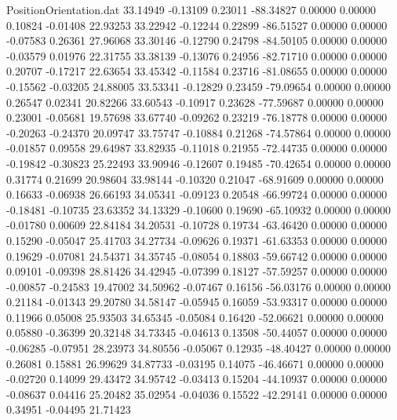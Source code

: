 \begin{filecontents}{PositionOrientation.dat}
  33.14949   -0.13109    0.23011   -88.34827    0.00000    0.00000    0.10824   -0.01408   22.93253
  33.22942   -0.12244    0.22899   -86.51527    0.00000    0.00000   -0.07583    0.26361   27.96068
  33.30146   -0.12790    0.24798   -84.50105    0.00000    0.00000   -0.03579    0.01976   22.31755
  33.38139   -0.13076    0.24956   -82.71710    0.00000    0.00000    0.20707   -0.17217   22.63654
  33.45342   -0.11584    0.23716   -81.08655    0.00000    0.00000   -0.15562   -0.03205   24.88005
  33.53341   -0.12829    0.23459   -79.09654    0.00000    0.00000    0.26547    0.02341   20.82266
  33.60543   -0.10917    0.23628   -77.59687    0.00000    0.00000    0.23001   -0.05681   19.57698
  33.67740   -0.09262    0.23219   -76.18778    0.00000    0.00000   -0.20263   -0.24370   20.09747
  33.75747   -0.10884    0.21268   -74.57864    0.00000    0.00000   -0.01857    0.09558   29.64987
  33.82935   -0.11018    0.21955   -72.44735    0.00000    0.00000   -0.19842   -0.30823   25.22493
  33.90946   -0.12607    0.19485   -70.42654    0.00000    0.00000    0.31774    0.21699   20.98604
  33.98144   -0.10320    0.21047   -68.91609    0.00000    0.00000    0.16633   -0.06938   26.66193
  34.05341   -0.09123    0.20548   -66.99724    0.00000    0.00000   -0.18481   -0.10735   23.63352
  34.13329   -0.10600    0.19690   -65.10932    0.00000    0.00000   -0.01780    0.00609   22.84184
  34.20531   -0.10728    0.19734   -63.46420    0.00000    0.00000    0.15290   -0.05047   25.41703
  34.27734   -0.09626    0.19371   -61.63353    0.00000    0.00000    0.19629   -0.07081   24.54371
  34.35745   -0.08054    0.18803   -59.66742    0.00000    0.00000    0.09101   -0.09398   28.81426
  34.42945   -0.07399    0.18127   -57.59257    0.00000    0.00000   -0.00857   -0.24583   19.47002
  34.50962   -0.07467    0.16156   -56.03176    0.00000    0.00000    0.21184   -0.01343   29.20780
  34.58147   -0.05945    0.16059   -53.93317    0.00000    0.00000    0.11966    0.05008   25.93503
  34.65345   -0.05084    0.16420   -52.06621    0.00000    0.00000    0.05880   -0.36399   20.32148
  34.73345   -0.04613    0.13508   -50.44057    0.00000    0.00000   -0.06285   -0.07951   28.23973
  34.80556   -0.05067    0.12935   -48.40427    0.00000    0.00000    0.26081    0.15881   26.99629
  34.87733   -0.03195    0.14075   -46.46671    0.00000    0.00000   -0.02720    0.14099   29.43472
  34.95742   -0.03413    0.15204   -44.10937    0.00000    0.00000   -0.08637    0.04416   25.20482
  35.02954   -0.04036    0.15522   -42.29141    0.00000    0.00000    0.34951   -0.04495   21.71423

\end{filecontents}
